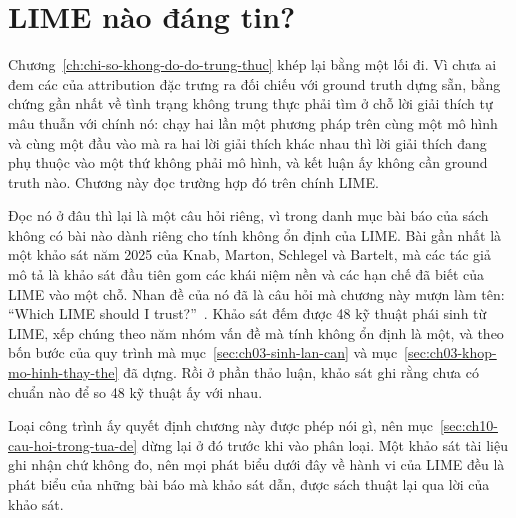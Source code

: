 %
\chapter{LIME nào đáng tin?}
\label{ch:lime-nao-dang-tin}

Chương~\ref{ch:chi-so-khong-do-do-trung-thuc} khép lại bằng một lối đi. Vì chưa
ai đem các  của attribution đặc trưng
ra đối chiếu với ground truth dựng sẵn, bằng chứng gần nhất về tình trạng không
trung thực phải tìm ở chỗ lời giải thích tự mâu thuẫn với chính nó: chạy hai lần
một phương pháp trên cùng một mô hình và cùng một đầu vào mà ra hai lời giải
thích khác nhau thì lời giải thích đang phụ thuộc vào một thứ không phải mô
hình, và kết luận ấy không cần ground truth nào. Chương này đọc trường hợp đó
trên chính LIME.

Đọc nó ở đâu thì lại là một câu hỏi riêng, vì trong danh mục bài báo của sách
không có bài nào dành riêng cho tính không ổn định của LIME. Bài gần nhất là
một khảo sát năm 2025 của Knab, Marton, Schlegel và Bartelt, mà các tác giả mô tả là khảo sát đầu tiên gom
các khái niệm nền và các hạn chế đã biết của LIME vào một chỗ. Nhan đề của nó đã
là câu hỏi mà chương này mượn làm tên:
\enquote{Which LIME should I trust?}~\autocite{p22whichlime}. Khảo sát đếm được
48 kỹ thuật phái sinh từ LIME, xếp chúng theo năm nhóm vấn đề mà tính không ổn
định là một, và theo bốn bước của quy trình mà
mục~\ref{sec:ch03-sinh-lan-can} và mục~\ref{sec:ch03-khop-mo-hinh-thay-the} đã
dựng. Rồi ở phần thảo luận, khảo sát ghi rằng chưa có chuẩn nào để so 48 kỹ
thuật ấy với nhau.

Loại công trình ấy quyết định chương này được phép nói gì, nên
mục~\ref{sec:ch10-cau-hoi-trong-tua-de} dừng lại ở đó trước khi vào phân loại.
Một khảo sát tài liệu ghi nhận chứ không đo, nên mọi phát biểu dưới đây về hành
vi của LIME đều là phát biểu của những bài báo mà khảo sát dẫn, được sách
thuật lại qua lời của khảo sát.









